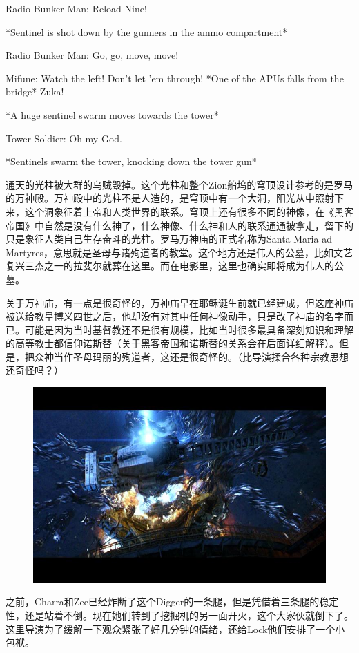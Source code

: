 \documentclass[UTF8]{ctexart}
\newenvironment{myquote}{\color{green} \setlength{\leftskip}{6em} \setlength{\rightskip}{4em} \setlength{\parindent}{-2em}}{\par}
\begin{document}
\begin{myquote}
Radio Bunker Man: Reload Nine!

*Sentinel is shot down by the gunners in the ammo compartment*

Radio Bunker Man: Go, go, move, move!

Mifune: Watch the left! Don't let 'em through! *One of the APUs falls from the bridge* Zuka!

*A huge sentinel swarm moves towards the tower*

Tower Soldier: Oh my God.

*Sentinels swarm the tower, knocking down the tower gun*
\end{myquote}

通天的光柱被大群的乌贼毁掉。这个光柱和整个Zion船坞的穹顶设计参考的是罗马的万神殿。万神殿中的光柱不是人造的，是穹顶中有一个大洞，阳光从中照射下来，这个洞象征着上帝和人类世界的联系。穹顶上还有很多不同的神像，在《黑客帝国》中自然是没有什么神了，什么神像、什么神和人的联系通通被拿走，留下的只是象征人类自己生存奋斗的光柱。罗马万神庙的正式名称为Santa Maria ad Martyres，意思就是圣母与诸殉道者的教堂。这个地方还是伟人的公墓，比如文艺复兴三杰之一的拉斐尔就葬在这里。而在电影里，这里也确实即将成为伟人的公墓。

关于万神庙，有一点是很奇怪的，万神庙早在耶稣诞生前就已经建成，但这座神庙被送给教皇博义四世之后，他却没有对其中任何神像动手，只是改了神庙的名字而已。可能是因为当时基督教还不是很有规模，比如当时很多最具备深刻知识和理解的高等教士都信仰诺斯替（关于黑客帝国和诺斯替的关系会在后面详细解释）。但是，把众神当作圣母玛丽的殉道者，这还是很奇怪的。（比导演揉合各种宗教思想还奇怪吗？）

\begin{figure}[htb]
\centering
\includegraphics[width=0.5\linewidth]{fig/14a938db21aeea66d0164ed2.jpg}
\end{figure}

之前，Charra和Zee已经炸断了这个Digger的一条腿，但是凭借着三条腿的稳定性，还是站着不倒。现在她们转到了挖掘机的另一面开火，这个大家伙就倒下了。这里导演为了缓解一下观众紧张了好几分钟的情绪，还给Lock他们安排了一个小包袱。
\end{document}

